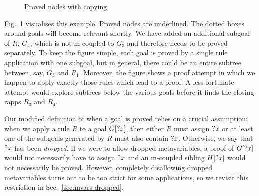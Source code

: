 \begin{figure}
  \caption{Proved nodes with copying}%
  \label{fig:mvars-proved}
\end{figure}

Fig.~\ref{fig:mvars-proved} visualises this example. Proved nodes are
underlined. The dotted boxes around goals will become relevant shortly. We have
added an additional subgoal of $R$, $G_{4}$, which is not m-coupled to $G_{3}$
and therefore needs to be proved separately. To keep the figure simple, each
goal is proved by a single rule application with one subgoal, but in general,
there could be an entire subtree between, say, $G_{3}$ and $R_{1}$. Moreover,
the figure shows a proof attempt in which we happen to apply exactly those rules
which lead to a proof. A less fortunate attempt would explore subtrees below the
various goals before it finds the closing rapps $R_{3}$ and $R_{4}$.

Our modified definition of when a goal is proved relies on a crucial assumption:
when we apply a rule $R$ to a goal $G[\mathit{?x}]$, then either $R$ must assign
$\mathit{?x}$ or at least one of the subgoals generated by $R$ must also contain
$\mathit{?x}$. Otherwise, we say that $\mathit{?x}$ has been \emph{dropped}. If we were to
allow dropped metavariables, a proof of $G[\mathit{?x}]$ would not necessarily have
to assign $\mathit{?x}$ and an m-coupled sibling $H[\mathit{?x}]$ would not necessarily be
proved. However, completely disallowing dropped metavariables turns out to be
too strict for some applications, so we revisit this restriction in
Sec.~\ref{sec:mvars-dropped}.


